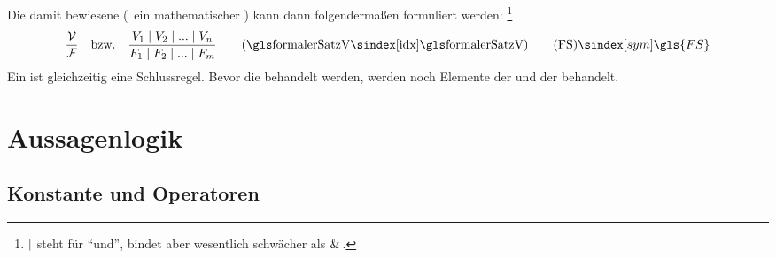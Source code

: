 Die damit bewiesene  (\textzB\ ein mathematischer ) kann dann folgendermaßen formuliert werden:%
\footnote{%
	$\mid$ steht für \enquote{und}, bindet aber wesentlich schwächer als $\operatorname{\operatorname{\&}\,}$.%
}
\[
	\frac{\Voraussetzungen}{\Folgerungen} \quad \text{\textbzw} \quad
	\frac{\Voraussetzung_1 \srand \Voraussetzung_2 \srand ... \srand \Voraussetzung_n}{\Folgerung_1 \srand \Folgerung_2 \srand ... \srand \Folgerung_m}
	\qquad \text{(\glsIdx{formalerSatzV})}
	\tag{\tagFS} \sym{\gls{FS}}
	\label{def:formalerSatz}
\]
Ein  ist gleichzeitig eine Schlussregel.
Bevor die  behandelt werden, werden noch Elemente der \emph{} und der \emph{} behandelt.

\section{Aussagenlogik}%
\label{sec:Aussagenlogik}


\subsection{Konstante und Operatoren}%
\label{sub:Operatoren}

\begingroup%
\renewcommand*{\objqt}[1]{<$#1$>}%

